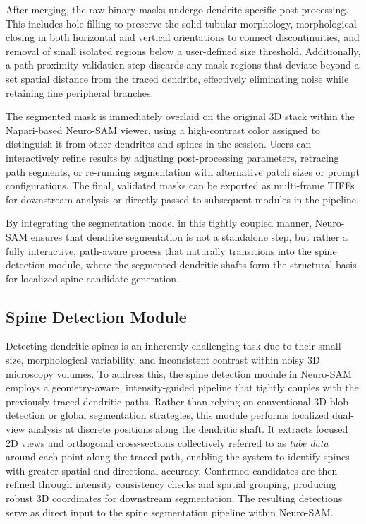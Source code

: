 After merging, the raw binary masks undergo dendrite-specific post-processing. This includes hole filling to preserve the solid tubular morphology, morphological closing in both horizontal and vertical orientations to connect discontinuities, and removal of small isolated regions below a user-defined size threshold. Additionally, a path-proximity validation step discards any mask regions that deviate beyond a set spatial distance from the traced dendrite, effectively eliminating noise while retaining fine peripheral branches.

The segmented mask is immediately overlaid on the original 3D stack within the Napari-based Neuro-\gls{SAM} viewer, using a high-contrast color assigned to distinguish it from other dendrites and spines in the session. Users can interactively refine results by adjusting post-processing parameters, retracing path segments, or re-running segmentation with alternative patch sizes or prompt configurations. The final, validated masks can be exported as multi-frame TIFFs for downstream analysis or directly passed to subsequent modules in the pipeline.

By integrating the segmentation model in this tightly coupled manner, Neuro-\gls{SAM} ensures that dendrite segmentation is not a standalone step, but rather a fully interactive, path-aware process that naturally transitions into the spine detection module, where the segmented dendritic shafts form the structural basis for localized spine candidate generation.

\subsection{Spine Detection Module}

Detecting dendritic spines is an inherently challenging task due to their small size, morphological variability, and inconsistent contrast within noisy 3D microscopy volumes. To address this, the spine detection module in Neuro-\gls{SAM} employs a geometry-aware, intensity-guided pipeline that tightly couples with the previously traced dendritic paths. Rather than relying on conventional 3D blob detection or global segmentation strategies, this module performs localized dual-view analysis at discrete positions along the dendritic shaft. It extracts focused 2D views and orthogonal cross-sections collectively referred to as \textit{tube data} around each point along the traced path, enabling the system to identify spines with greater spatial and directional accuracy. Confirmed candidates are then refined through intensity consistency checks and spatial grouping, producing robust 3D coordinates for downstream segmentation. The resulting detections serve as direct input to the spine segmentation pipeline within Neuro-\gls{SAM}.

